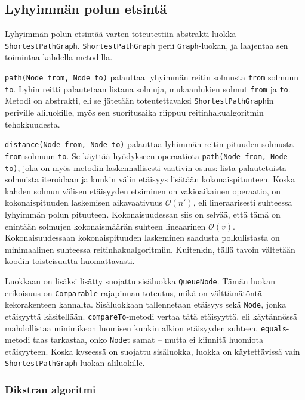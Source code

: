 \documentclass[10pt,a4paper]{article}
\begin{document}
\subsection{Lyhyimmän polun etsintä}
\label{path}

Lyhyimmän polun etsintää varten toteutettiin abstrakti luokka \texttt{ShortestPathGraph}. \texttt{ShortestPathGraph} perii \texttt{Graph}-luokan, ja laajentaa sen toimintaa kahdella metodilla.

\texttt{path(Node from, Node to)} palauttaa lyhyimmän reitin solmusta \texttt{from} solmuun \texttt{to}. Lyhin reitti palautetaan listana solmuja, mukaanlukien solmut \texttt{from} ja \texttt{to}. Metodi on abstrakti, eli se jätetään toteutettavaksi \texttt{ShortestPathGraph}in  periville aliluokille, myös sen suoritusaika riippuu reitinhakualgoritmin tehokkuudesta.

\texttt{distance(Node from, Node to)} palauttaa lyhimmän reitin pituuden solmusta \texttt{from} solmuun \texttt{to}. Se käyttää hyödykseen operaatiota \texttt{path(Node from, Node to)}, joka on myös metodin laskennallisesti vaativin osuus: lista palautetuista solmuista iteroidaan ja kunkin välin etäisyys lisätään kokonaispituuteen. Koska kahden solmun välisen etäisyyden etsiminen on vakioaikainen operaatio, on kokonaispituuden laskemisen aikavaativuus $\mathcal{O}(n')$, eli lineraarisesti suhteessa lyhyimmän polun pituuteen. Kokonaisuudessan siis on selvää, että tämä on enintään solmujen kokonaismäärän suhteen lineaarinen $\mathcal{O}(v)$. Kokonaisuudessaan kokonaispituuden laskeminen saadusta polkulistasta on minimaalinen suhteessa reitinhakualgoritmiin. Kuitenkin, tällä tavoin vältetään koodin toisteisuutta huomattavasti.

Luokkaan on lisäksi lisätty suojattu sisäluokka \texttt{QueueNode}. Tämän luokan erikoisuus on \texttt{Comparable}-rajapinnan toteutus, mikä on välttämätöntä kekorakenteen kannalta. Sisäluokkaan tallennetaan etäisyys sekä \texttt{Node}, jonka etäisyyttä käsitellään. \texttt{compareTo}-metodi vertaa tätä etäisyyttä, eli käytännössä mahdollistaa minimikeon luomisen kunkin alkion etäisyyden suhteen. \texttt{equals}-metodi taas tarkastaa, onko \texttt{Node}t samat -- mutta ei kiinnitä huomiota etäisyyteen. Koska kyseessä on suojattu sisäluokka, luokka on käytettävissä vain \texttt{ShortestPathGraph}-luokan aliluokille.

\subsubsection{Dikstran algoritmi}
\end{document}
